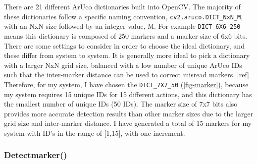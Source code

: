 \documentclass[oneside,%
                    author={Malak Hajji},
                    degree={BSc},
                    title={Designing An Accessible Computational Toolkit For Students},
                  subtitle={With Mixed Visual Abilities}]{dissertation}
\begin{document}
There are 21 different ArUco dictionaries built into OpenCV. The majority of these dictionaries follow a specific naming convention, \texttt{cv2.aruco.DICT\_NxN\_M}, with an NxN size followed by an integer value, M. For example \texttt{DICT\_6X6\_250} means this dictionary is composed of 250 markers and a marker size of 6x6 bits. There are some settings to consider in order to choose the ideal dictionary, and these differ from system to system. It is generally more ideal to pick a dictionary with a larger NxN grid size, balanced with a low number of unique ArUco IDs such that the inter-marker distance can be used to correct misread markers. [ref]
Therefore, for my system, I have chosen the \texttt{DICT\_7X7\_50} (\ref{fig-marker}), because my system requires 15 unique IDs for 15 different actions, and this dictionary has the smallest number of unique IDs (50 IDs). The marker size of 7x7 bits also provides more accurate detection results than other marker sizes due to the larger grid size and inter-marker distance. 
I have generated a total of 15 markers for my system with ID’s in the range of [1,15], with one increment. 

\subsubsection{Detectmarker()}
\end{document}
